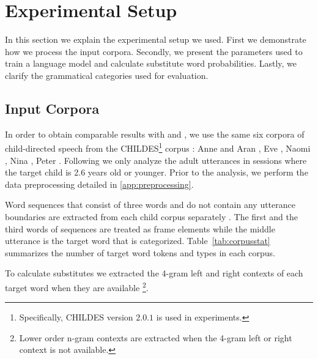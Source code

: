 \setcounter{ExperimentCounter}{1}
\section{Experimental Setup}

In this section we explain the experimental setup we used. First we
demonstrate how we process the input corpora. Secondly, we present
the parameters used to train a language model and calculate substitute word
probabilities. Lastly, we clarify the grammatical categories used for evaluation.

\subsection{Input Corpora}

In order to obtain comparable results with \cite{clair2010} and
\cite{Mintz200391}, we use the same six corpora of child-directed speech from
the CHILDES\footnote{ Specifically, CHILDES version $2.0.1$ is used in
experiments.} corpus \citep*{macwhinney2000childes}: Anne and Aran
\citep*{theakston2001role}, Eve \citep*{JCL:1765112}, Naomi
\citep*{sachs1983talking}, Nina \citep*{suppes1974semantics}, Peter
\citep*{Bloom1974380, bloom1975structure}.  Following \cite{Mintz200391} we
only analyze the adult utterances in sessions where the target child is 2.6
years old or younger.  Prior to the analysis, we perform the data preprocessing
detailed in \ref{app:preprocessing}.

 
Word sequences that consist of three words and do not contain any utterance
boundaries are extracted from each child corpus separately
\citep*{Mintz200391}.  The first and the third words of sequences are treated
as frame elements while the middle utterance is the target word that is
categorized.  Table~\ref{tab:corpusstat} summarizes the number of target word
tokens and types in each corpus.   

To calculate substitutes we extracted the 4-gram left and right contexts of
each target word when they are available \footnote{Lower order n-gram contexts
are extracted when the 4-gram left or right context is not available.}.

